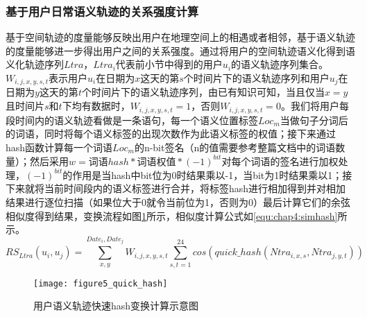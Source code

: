 \subsubsection{基于用户日常语义轨迹的关系强度计算}
基于空间轨迹的度量能够反映出用户在地理空间上的相遇或者相邻，基于语义轨迹的度量能够进一步得出用户之间的关系强度。通过将用户的空间轨迹语义化得到语义化轨迹序列$Ltra$，$Ltra_{i}$代表前小节中得到的用户$u_{i}$的语义轨迹序列集合。$W_{i,j,x,y,s,t}$表示用户$u_{i}$在日期为$x$这天的第$s$个时间片下的语义轨迹序列和用户$u_{j}$在日期为$y$这天的第$t$个时间片下的语义轨迹序列，由已有知识可知，当且仅当$x=y$且时间片$s$和$t$下均有数据时，$W_{i,j,x,y,s,t}=1$，否则$W_{i,j,x,y,s,t}=0$。我们将用户每段时间内的语义轨迹看做是一条语句，每一个语义位置标签$Loc_{m}$当做句子分词后的词语，同时将每个语义标签的出现次数作为此语义标签的权值；接下来通过hash函数计算每一个词语$Loc_{m}$的n-bit签名（n的值需要参考整篇文档中的词语数量）；然后采用$w=\text{词语}hash*\text{词语权值}*(-1)^{bit}$对每个词语的签名进行加权处理，$(-1)^{bit}$的作用是当hash中bit位为0时结果乘以-1，当bit为1时结果乘以1；接下来就将当前时间段内的语义标签进行合并，将标签hash进行相加得到并对相加结果进行逐位扫描（如果位大于0就令当前位为1，否则为0）最后计算它们的余弦相似度得到结果，变换流程如图\ref{fig:quick_hash}所示，相似度计算公式如\ref{equ:chap4:simhash}所示。
\begin{equation}
\label{equ:chap4:simhash}
RS_{Ltra}(u_{i},u_{j})=\sum_{x ,y }^{ Date_{i}, Date_{j}}W_{i,j,x,y,s,t}\sum_{s,t=1}^{24} cos(quick\_hash(Ntra_{i,x,s},Ntra_{j,y,t}))
\end{equation}
\begin{figure}[htb]
\centering
\texttt{[image: figure5\_quick\_hash]}
\caption{用户语义轨迹快速hash变换计算示意图}
\label{fig:quick_hash}
\end{figure}
